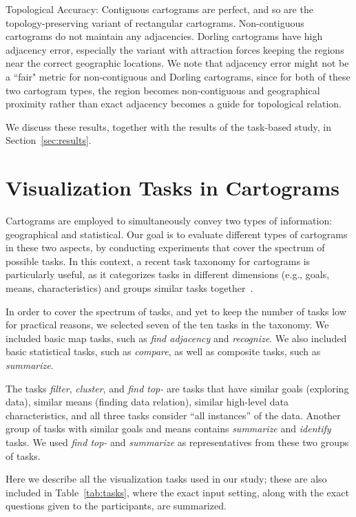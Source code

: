 \documentclass[10pt,journal,compsoc]{IEEEtran}
\begin{document}
Topological Accuracy: Contiguous cartograms are perfect, and so are the topology-preserving variant of rectangular cartograms. Non-contiguous cartograms do not maintain any adjacencies. Dorling cartograms have high adjacency error, especially the variant with attraction forces keeping the regions near the correct geographic locations. 
We note that adjacency error might not be a ``fair" metric for non-contiguous and Dorling cartograms, since for both of these two cartogram types, the region becomes non-contiguous and geographical proximity rather than exact adjacency becomes a guide for topological relation.

We discuss these results, together with the results of the task-based study, in Section~\ref{sec:results}.





\section{Visualization Tasks in Cartograms}
Cartograms are employed to simultaneously convey two types of information: geographical and statistical.
 Our goal is to evaluate different types of cartograms in these two aspects, by conducting experiments that cover the spectrum of possible tasks. In this context, a recent task taxonomy for cartograms is particularly useful, as it categorizes tasks in different dimensions (e.g., goals, means, characteristics) and groups similar tasks together~\cite{Task_C}. 
 
In order to cover the spectrum of tasks, and yet to keep the number of tasks low for practical reasons, we selected seven of the ten tasks in the taxonomy. We included basic map tasks, such as \textit{find adjacency} and 
 \textit{recognize}. We also included basic statistical tasks, such as \textit{compare}, as well as composite tasks, such as \textit{summarize}. 
 
The tasks \textit{filter}, \textit{cluster}, and \textit{find top-} are tasks that have similar goals (exploring data), similar means (finding data relation), similar high-level data characteristics, and all three tasks consider ``all instances'' of the data. 
Another group of tasks with similar goals and means contains \textit{summarize} and \textit{identify} tasks.
We used \textit{find top-} and \textit{summarize} as representatives from these two groups of tasks.

Here we describe all the visualization tasks used in our study; these are also included in Table~\ref{tab:tasks}, where  the exact input setting, along with the exact questions given to the participants, are summarized.
\end{document}
